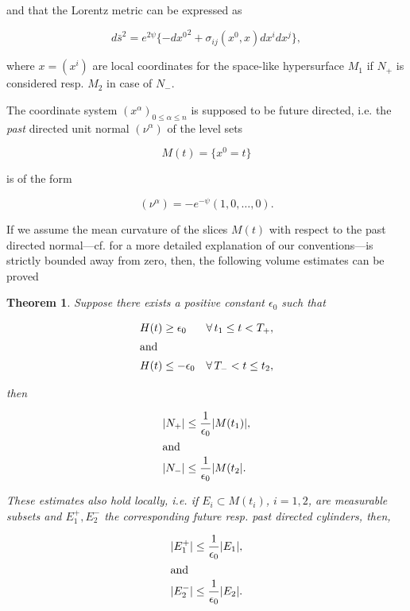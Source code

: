 \documentclass[ a4paper, oneside]{amsart}
\newcommand{\al}{\alpha}
\newcommand{\e}{\epsilon}
\newcommand{\s}{\sigma}
\newcommand{\A}{\forall}
\newcommand\su{\subset}
\newcommand{\abs}[1]{\lvert#1\rvert}
\newcommand{\tit}{\textit}
\newcommand{\ci}{\cite}
\newcommand{\bt}{\begin{thm}}
\newcommand{\et}{\end{thm}}
\newcommand\nd{\noindent}
\newcommand\cvm{\vspace\Cmedskipamount}
\newcommand{\lae}[1]{\label{E:#1}}
\newcommand{\lat}[1]{\label{T:#1}}
\theoremstyle{plain}
\newtheorem{thm}{Theorem}[section]
\theoremstyle{definition}
\theoremstyle{remark}
\numberwithin{equation}{section}
\begin{document}
\cvm
\nd and that the Lorentz metric can be expressed as

\begin{equation}\lae{0.3}
d\bar s^2=e^{2\psi}\{-{dx^0}^2+\s_{ij}(x^0,x)dx^idx^j\},
\end{equation}

\cvm
\nd where $x=(x^i)$ are local coordinates for the space-like hypersurface $M_1$
if $N_+$ is considered resp. $M_2$ in case of $N_-$.

The coordinate system $(x^\al)_{0\le\al\le n}$ is supposed to be future
directed, i.e. the \tit{past} directed unit normal $(\nu^\al)$ of the level sets

\begin{equation}
M(t)=\{x^0=t\}
\end{equation}

\cvm
\nd is of the form

\begin{equation}\lae{0.5}
(\nu^\al)=-e^{-\psi}(1,0,\ldots,0).
\end{equation}

\cvm
If we assume the mean curvature of the slices $M(t)$ with respect to the past
directed normal---cf. \ci[Section 2]{cg8} for a more detailed explanation of our
conventions---is strictly bounded away from zero, then, the following volume
estimates can be proved

\bt\lat{0.1}
Suppose there exists a positive constant $\e_0$ such that


\begin{align}
H(t)&\ge \e_0&\A\,t_1\le t< T_+&,\lae{0.6}\\
\intertext{and}
H(t)&\le-\e_0&\A\,T_-<t\le t_2&,\lae{0.7}
\end{align}

\cvm
\nd then

\begin{align}
\abs{N_+}&\le \frac1{\e_0}\abs{M(t_1)},\\
\intertext{and}
\abs{N_-}&\le \frac1{\e_0}\abs{M(t_2}.
\end{align}

These estimates also hold locally, i.e. if $E_i\su M(t_i)$, $i=1,2$, are measurable
subsets and $E_1^+,E_2^-$ the corresponding future resp. past directed
cylinders, then,

\begin{align}
\abs{E_1^+}&\le\frac1{\e_0}\abs{E_1},\lae{0.10}\\
\intertext{and}
\abs{E_2^-}&\le\frac1{\e_0}\abs{E_2}.
\end{align}
\et
\end{document}
